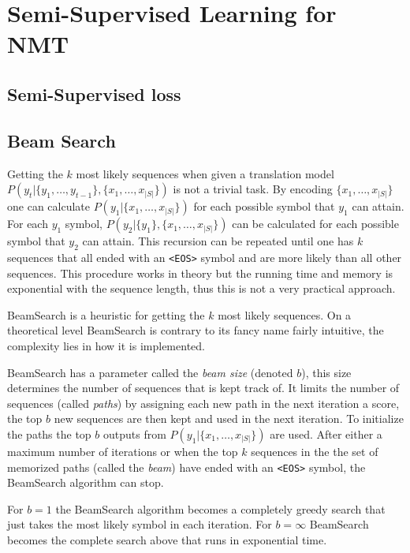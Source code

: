 \section{Semi-Supervised Learning for NMT}
\label{sec:theory:semi-supervised}

\subsection{Semi-Supervised loss}

\subsection{Beam Search}

Getting the $k$ most likely sequences when given a translation model $P(y_t | \{y_1, \dots, y_{t-1}\}, \{x_1, \dots, x_{|S|}\})$ is not a trivial task. By encoding $\{x_1, \dots, x_{|S|}\}$ one can calculate $P(y_1| \{x_1, \dots, x_{|S|}\})$ for each possible symbol that $y_1$ can attain. For each $y_1$ symbol, $P(y_2| \{y_1\}, \{x_1, \dots, x_{|S|}\})$ can be calculated for each possible symbol that $y_2$ can attain. This recursion can be repeated until one has $k$ sequences that all ended with an \texttt{<EOS>} symbol and are more likely than all other sequences. This procedure works in theory but the running time and memory is exponential with the sequence length, thus this is not a very practical approach.

BeamSearch is a heuristic for getting the $k$ most likely sequences. On a theoretical level BeamSearch is contrary to its fancy name fairly intuitive, the complexity lies in how it is implemented.

BeamSearch has a parameter called the \textit{beam size} (denoted $b$), this size determines the number of sequences that is kept track of. It limits the number of sequences (called \textit{paths}) by assigning each new path in the next iteration a score, the top $b$ new sequences are then kept and used in the next iteration. To initialize the paths the top $b$ outputs from $P(y_1| \{x_1, \dots, x_{|S|}\})$ are used. After either a maximum number of iterations or when the top $k$ sequences in the the set of memorized paths (called the \textit{beam}) have ended with an \texttt{<EOS>} symbol, the BeamSearch algorithm can stop.


For $b = 1$ the BeamSearch algorithm becomes a completely greedy search that just takes the most likely symbol in each iteration. For $b = \infty$ BeamSearch becomes the complete search above that runs in exponential time. 